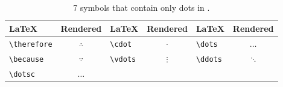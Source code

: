 \begin{table}[ht]
        \centering

            \begin{tabular}{lc|lc|lc}
                \toprule
                \LaTeX & Rendered & \LaTeX & Rendered & \LaTeX & Rendered \\
                \midrule
\verb+\therefore+ & $\therefore$ &\verb+\cdot+  & $\cdot$  &\verb+\dots+  & $\dots$\\
\verb+\because+   & $\because$   &\verb+\vdots+ & $\vdots$ &\verb+\ddots+ & $\ddots$\\
\verb+\dotsc+     & $\dotsc$     &\verb+ +      &          &\verb+ +      &  \\
        \bottomrule
    \end{tabular}

    \caption{7 symbols that contain only dots in \dbName.}
    \label{table:symbols-of-db-6}
\end{table}


